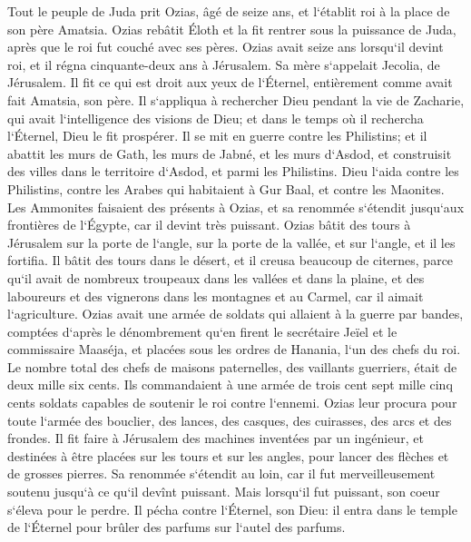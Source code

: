 \verse Tout le peuple de Juda prit Ozias, âgé de seize ans, et l`établit roi à la place de son père Amatsia. 
\verse Ozias rebâtit Éloth et la fit rentrer sous la puissance de Juda, après que le roi fut couché avec ses pères. 
\verse Ozias avait seize ans lorsqu`il devint roi, et il régna cinquante-deux ans à Jérusalem. Sa mère s`appelait Jecolia, de Jérusalem. 
\verse Il fit ce qui est droit aux yeux de l`Éternel, entièrement comme avait fait Amatsia, son père. 
\verse Il s`appliqua à rechercher Dieu pendant la vie de Zacharie, qui avait l`intelligence des visions de Dieu; et dans le temps où il rechercha l`Éternel, Dieu le fit prospérer. 
\verse Il se mit en guerre contre les Philistins; et il abattit les murs de Gath, les murs de Jabné, et les murs d`Asdod, et construisit des villes dans le territoire d`Asdod, et parmi les Philistins. 
\verse Dieu l`aida contre les Philistins, contre les Arabes qui habitaient à Gur Baal, et contre les Maonites. 
\verse Les Ammonites faisaient des présents à Ozias, et sa renommée s`étendit jusqu`aux frontières de l`Égypte, car il devint très puissant. 
\verse Ozias bâtit des tours à Jérusalem sur la porte de l`angle, sur la porte de la vallée, et sur l`angle, et il les fortifia. 
\verse Il bâtit des tours dans le désert, et il creusa beaucoup de citernes, parce qu`il avait de nombreux troupeaux dans les vallées et dans la plaine, et des laboureurs et des vignerons dans les montagnes et au Carmel, car il aimait l`agriculture. 
\verse Ozias avait une armée de soldats qui allaient à la guerre par bandes, comptées d`après le dénombrement qu`en firent le secrétaire Jeïel et le commissaire Maaséja, et placées sous les ordres de Hanania, l`un des chefs du roi. 
\verse Le nombre total des chefs de maisons paternelles, des vaillants guerriers, était de deux mille six cents. 
\verse Ils commandaient à une armée de trois cent sept mille cinq cents soldats capables de soutenir le roi contre l`ennemi. 
\verse Ozias leur procura pour toute l`armée des bouclier, des lances, des casques, des cuirasses, des arcs et des frondes. 
\verse Il fit faire à Jérusalem des machines inventées par un ingénieur, et destinées à être placées sur les tours et sur les angles, pour lancer des flèches et de grosses pierres. Sa renommée s`étendit au loin, car il fut merveilleusement soutenu jusqu`à ce qu`il devînt puissant. 
\verse Mais lorsqu`il fut puissant, son coeur s`éleva pour le perdre. Il pécha contre l`Éternel, son Dieu: il entra dans le temple de l`Éternel pour brûler des parfums sur l`autel des parfums. 
